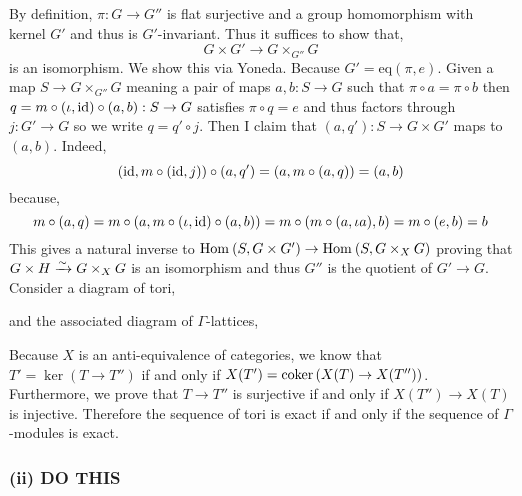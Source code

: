 \documentclass[12pt]{article}
\begin{document}
By definition, $\pi : G \to G''$ is flat surjective and a group homomorphism with kernel $G'$ and thus is $G'$-invariant. Thus it suffices to show that,
\[ G \times G' \to G \times_{G''} G \]
is an isomorphism. We show this via Yoneda. Because $G' = \mathrm{eq}(\pi, e)$. Given a map $S \to G \times_{G''} G$ meaning a pair of maps $a,b : S \to G$ such that $\pi \circ a = \pi \circ b$ then $q = m \circ (\iota, \mathrm{id}) \circ (a,b) : S \to G$ satisfies $\pi \circ q = e$ and thus factors through $j : G' \to G$ so we write $q = q' \circ j$. Then I claim that $(a, q') : S \to G \times G'$ maps to $(a,b)$. Indeed, 
\[ (\mathrm{id}, m \circ (\mathrm{id}, j)) \circ (a, q') = (a, m \circ (a, q)) = (a, b) \]
because,
\[ m \circ (a,q) = m \circ (a, m \circ (\iota, \mathrm{id}) \circ (a,b)) = m \circ (m \circ (a, \iota a), b) = m \circ (e, b) = b \]
This gives a natural inverse to $\mathrm{Hom}_{} \left( S, G \times G' \right) \to \mathrm{Hom}_{} \left( S, G \times_X G \right)$ proving that $G \times H \xrightarrow{\sim} G \times_X G$ is an isomorphism and thus $G''$ is the quotient of $G' \to G$. 
\bigskip\\
Consider a diagram of tori,
\begin{center}
\end{center}
and the associated diagram of $\Gamma$-lattices,
\begin{center}
\end{center}
Because $X$ is an anti-equivalence of categories, we know that $T' = \ker{(T \to T'')}$ if and only if $X(T') = \operatorname{\mathrm{coker}}{(X(T) \to X(T''))}$. Furthermore, we prove that $T \to T''$ is surjective if and only if $X(T'') \to X(T)$ is injective. Therefore the sequence of tori is exact if and only if the sequence of $\Gamma$-modules is exact. 


\subsubsection{(ii) DO THIS}
\end{document}
